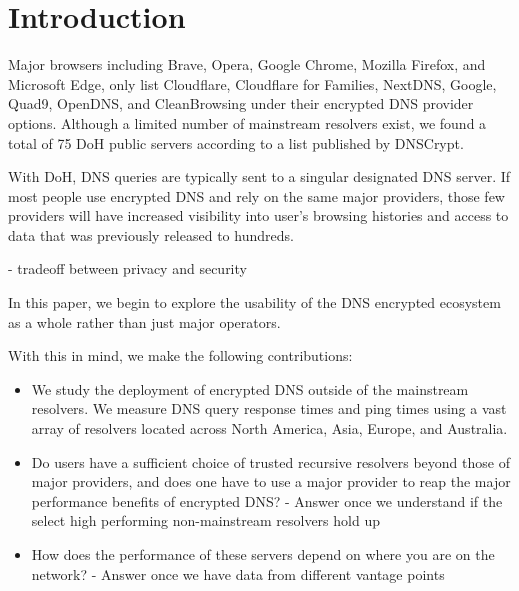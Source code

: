 \section{Introduction}\label{sec:intro}

Major browsers including Brave, Opera, Google Chrome, Mozilla Firefox, and Microsoft Edge, only list Cloudflare, Cloudflare for Families, NextDNS, Google, Quad9, OpenDNS, and CleanBrowsing under their encrypted DNS provider options.
Although a limited number of mainstream resolvers exist, we found a total of 75 DoH public servers according to a list published by DNSCrypt.

With DoH, DNS queries are typically sent to a singular designated DNS server. 
If most people use encrypted DNS and rely on the same major providers, those few providers will have increased visibility into user's browsing histories and access to data that was previously released to hundreds. 

- tradeoff between privacy and security 

In this paper, we begin to explore the usability of the DNS encrypted ecosystem as a whole rather than just major operators. 

With this in mind, we make the following contributions:

\begin{itemize}
\setlength\itemsep{0em}
\item We study the deployment of encrypted DNS outside of the mainstream resolvers. We measure DNS query response times and ping times using a vast array of resolvers located across North America, Asia, Europe, and Australia. 
\item Do users have a sufficient choice of trusted recursive resolvers beyond those of major providers, and does one have to use a major provider to reap the major performance benefits of encrypted DNS?
	- Answer once we understand if the select high performing non-mainstream resolvers hold up 
\item How does the performance of these servers depend on where you are on the network?
	- Answer once we have data from different vantage points 

\end{itemize}

